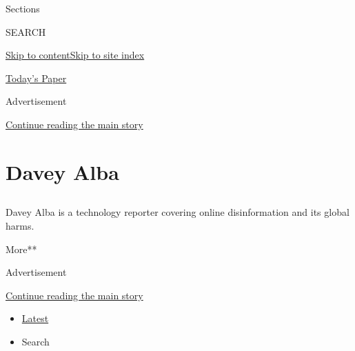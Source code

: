Sections

SEARCH

\protect\hyperlink{site-content}{Skip to
content}\protect\hyperlink{site-index}{Skip to site index}

\href{https://myaccount.nytimes3xbfgragh.onion/auth/login?response_type=cookie\&client_id=vi}{}

\href{https://www.nytimes3xbfgragh.onion/section/todayspaper}{Today's
Paper}

Advertisement

\protect\hyperlink{after-top}{Continue reading the main story}

\hypertarget{davey-alba}{%
\section{Davey Alba}\label{davey-alba}}

\subsection{}

Davey Alba is a technology reporter covering online disinformation and
its global harms.

More**

Advertisement

\protect\hyperlink{after-mid1}{Continue reading the main story}

\begin{itemize}
\tightlist
\item
  \protect\hyperlink{stream-panel}{Latest}
\item
  Search
\end{itemize}

